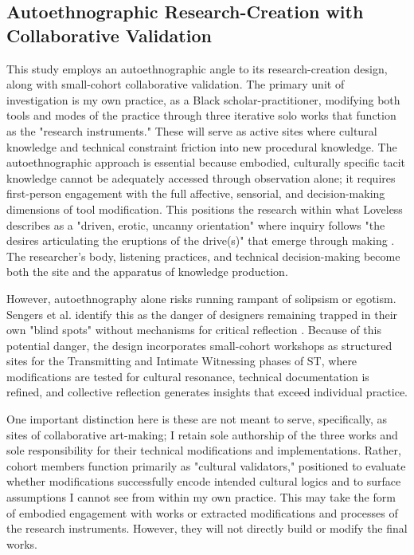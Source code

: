 \subsection{Autoethnographic Research-Creation with Collaborative Validation}

This study employs an autoethnographic angle to its research-creation design, along with small-cohort collaborative validation. The primary unit of investigation is my own practice, as a Black scholar-practitioner, modifying both tools and modes of the practice through three iterative solo works that function as the "research instruments." These will serve as active sites where cultural knowledge and technical constraint friction into new procedural knowledge. The autoethnographic approach is essential because embodied, culturally specific tacit knowledge cannot be adequately accessed through observation alone; it requires first-person engagement with the full affective, sensorial, and decision-making dimensions of tool modification. This positions the research within what Loveless describes as a "driven, erotic, uncanny orientation" where inquiry follows "the desires articulating the eruptions of the drive(s)" that emerge through making \parencites[105]{Loveless_2019}. The researcher's body, listening practices, and technical decision-making become both the site and the apparatus of knowledge production.

However, autoethnography alone risks running rampant of solipsism or egotism. Sengers et al. identify this as the danger of designers remaining trapped in their own "blind spots" without mechanisms for critical reflection \parencites[49]{Sengers_2005}. Because of this potential danger, the design incorporates small-cohort workshops as structured sites for the Transmitting and Intimate Witnessing phases of ST, where modifications are tested for cultural resonance, technical documentation is refined, and collective reflection generates insights that exceed individual practice. 

One important distinction here is these are not meant to serve, specifically, as sites of collaborative art-making; I retain sole authorship of the three works and sole responsibility for their technical modifications and implementations. Rather, cohort members function primarily as "cultural validators," positioned to evaluate whether modifications successfully encode intended cultural logics and to surface assumptions I cannot see from within my own practice. This may take the form of embodied engagement with works or extracted modifications and processes of the research instruments. However, they will not directly build or modify the final works.

